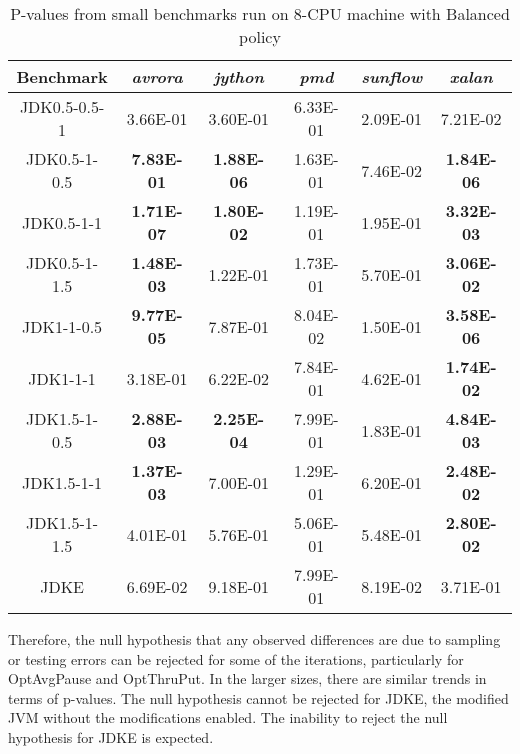 \begin{table}[H]
\caption{P-values from small benchmarks run on 8-CPU  machine with Balanced
policy}
\begin{tabular}[H]{|c|c|c|c|c|c|}
\hline
Benchmark & \emph{avrora} & \emph{jython} & \emph{pmd} & \emph{sunflow}
& \emph{xalan}\tabularnewline
\hline

JDK0.5-0.5-1 & 3.66E-01 &3.60E-01 & 6.33E-01
& 2.09E-01 & 7.21E-02\tabularnewline
\hline

JDK0.5-1-0.5 & \textbf{7.83E-01} & \textbf{1.88E-06} & 1.63E-01 &
7.46E-02 & \textbf{1.84E-06}\tabularnewline
\hline

JDK0.5-1-1 &\textbf{ 1.71E-07} & \textbf{1.80E-02 }& 1.19E-01 & 1.95E-01
& \textbf{3.32E-03}\tabularnewline
\hline

JDK0.5-1-1.5 & \textbf{1.48E-03} & 1.22E-01 & 1.73E-01 &
5.70E-01 & \textbf{3.06E-02}\tabularnewline
\hline

JDK1-1-0.5 & \textbf{9.77E-05} & 7.87E-01 & 8.04E-02 &
1.50E-01 &\textbf{ 3.58E-06}\tabularnewline
\hline

JDK1-1-1 & 3.18E-01 & 6.22E-02 & 7.84E-01 &
4.62E-01 & \textbf{1.74E-02}\tabularnewline
\hline

JDK1.5-1-0.5 &\textbf{ 2.88E-03} & \textbf{2.25E-04} & 7.99E-01 &
1.83E-01 & \textbf{4.84E-03}\tabularnewline
\hline

JDK1.5-1-1 & \textbf{1.37E-03 }& 7.00E-01 & 1.29E-01 &
6.20E-01 &\textbf{ 2.48E-02}\tabularnewline
\hline

JDK1.5-1-1.5 & 4.01E-01 & 5.76E-01 & 5.06E-01
& 5.48E-01 & \textbf{2.80E-02}\tabularnewline
\hline

JDKE & 6.69E-02 & 9.18E-01 & 7.99E-01 &
8.19E-02 & 3.71E-01\tabularnewline
\hline

\end{tabular}
\end{table}
Therefore, the null hypothesis that any observed differences are due to
sampling or testing errors can be rejected for some of the iterations,
particularly for OptAvgPause and OptThruPut. In the larger sizes, there
are similar trends in terms of p-values. The null hypothesis cannot be
rejected for JDKE, the modified JVM without the modifications enabled. The inability to reject the null hypothesis for JDKE is expected.
